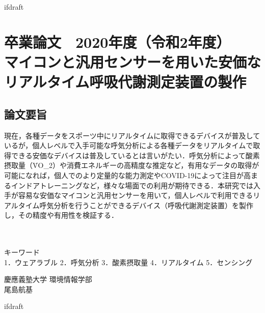 \expandafter\ifx\csname ifdraft\endcsname\relax
 
\fi

\section*{卒業論文　2020年度（令和2年度）\\マイコンと汎用センサーを用いた安価な\\リアルタイム呼吸代謝測定装置の製作}
\subsection*{論文要旨}
\noindent %

現在，各種データをスポーツ中にリアルタイムに取得できるデバイスが普及しているが，個人レベルで入手可能な呼気分析による各種データをリアルタイムで取得できる安価なデバイスは普及しているとは言いがたい．呼気分析によって酸素摂取量（\.{V}O_2）や消費エネルギーの高精度な推定など，有用なデータの取得が可能になれば，個人でのより定量的な能力測定やCOVID-19によって注目が高まるインドアトレーニングなど，様々な場面での利用が期待できる．本研究では入手が容易な安価なマイコンと汎用センサーを用いて，個人レベルで利用できるリアルタイム呼気分析を行うことができるデバイス（呼吸代謝測定装置）を製作し，その精度や有用性を検証する．

\\
\\
キーワード\\
1．ウェアラブル 2．呼気分析 3．酸素摂取量 4．リアルタイム 5．センシング\\
\begin{flushright} %
  慶應義塾大学 環境情報学部\\
  尾島航基
\end{flushright}

\expandafter\ifx\csname ifdraft\endcsname\relax
  
\fi
